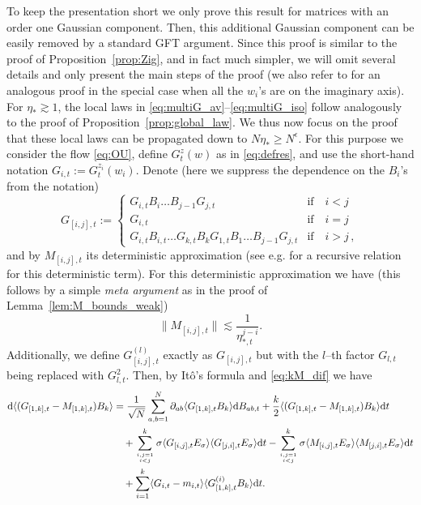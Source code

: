 \documentclass[10pt]{amsart}
\numberwithin{equation}{section}
\newcommand{\dif}{\mathrm{d}}
\begin{document}
To keep the presentation short we only prove this result for matrices with an order one Gaussian component. Then, this additional Gaussian component can be easily removed by a standard GFT argument. Since this proof is similar to the proof of Proposition~\ref{prop:Zig}, and in fact much simpler, we will omit several details and only present the main steps of the proof (we also refer to \cite{sparse_universality_Osman} for an analogous proof in the special case when all the $w_i$'s are on the imaginary axis). For $\eta_*\gtrsim 1$, the local laws in \eqref{eq:multiG_av}--\eqref{eq:multiG_iso} follow analogously to the proof of Proposition~\ref{prop:global_law}. We thus now focus on the proof that these local laws can be propagated down to $N\eta_*\ge N^\epsilon$. For this purpose we consider the flow \eqref{eq:OU}, define $G_t^z(w)$ as in \eqref{eq:defres}, and use the short-hand notation $G_{i,t}:=G_t^{z_i}(w_i)$. Denote (here we suppress the dependence on the $B_i$'s from the notation)
\begin{equation}
	{{G}}_{[{i}, {j}],t}:=\begin{cases}
		G_{i,t}B_i\dots B_{j-1}G_{j,t} & \mathrm{if}\quad  i<j \\
		G_{i,t} & \mathrm{if}\quad i=j \\
		G_{i,t}B_{i,t}\dots G_{k,t}B_k G_{1,t}B_1\dots B_{j-1} G_{j,t} &\mathrm{if}\quad i>j\,,
	\end{cases}
\end{equation}
and by $M_{[i,j],t}$ its deterministic approximation (see e.g. \cite[Lemma D.1]{non-herm_overlaps} for a recursive relation  for this deterministic term). For this deterministic approximation we have (this follows by a simple \emph{meta argument} as in the proof of Lemma~\ref{lem:M_bounds_weak})
\begin{equation}
\label{eq:Mboundeas}
\lVert M_{[i,j],t} \rVert\lesssim \frac{1}{\eta_{*,t}^{j-i}}.
\end{equation}
Additionally, we define $G_{[{i}, {j}],t}^{(l)}$ exactly as $G_{[{i},{j}],t}$ but with the $l$--th factor $G_{l,t}$ being
replaced with $G_{l,t}^2$.  Then, by It\^{o}'s formula and \eqref{eq:kM_dif} we have
\begin{equation}
	\begin{split}
		\label{eq:flowka}
		\dif \langle (G_{[1,k],t}-M_{{[1,k]},t})B_k\rangle&=\frac{1}{\sqrt{N}}\sum_{a,b=1}^N \partial_{ab}  \langle G_{[1,k],t}B_k\rangle\dif B_{ab,t}+\frac{k}{2}\langle (G_{[1,k],t}-M_{{[1,k]},t})B_k\rangle\dif t \\
		&\quad+\sum_{i,j=1\atop i< j}^k\sigma \langle G_{[i,j],t}E_\sigma\rangle\langle G_{[j,i],t} E_\sigma\rangle\dif t-\sum_{i,j=1\atop i< j}^k\sigma \langle M_{[i,j],t}E_\sigma\rangle\langle M_{[j,i],t} E_\sigma\rangle\dif t \\
		&\quad+\sum_{i=1}^k \langle G_{i,t}-m_{i,t}\rangle \langle G^{(i)}_{[1,k],t}B_k\rangle\dif t.
	\end{split}
\end{equation}
\end{document}
